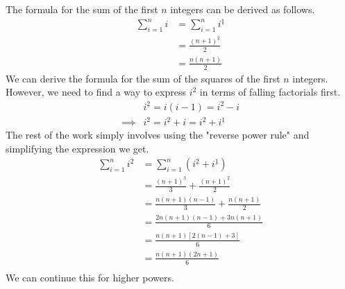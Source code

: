 \documentclass[12pt]{article}
\theoremstyle{definition}
\begin{document}
The formula for the sum of the first $n$ integers can be derived as follows.
\begin{align*}
    \sum_{i=1}^{n} i & = \sum_{i=1}^{n} i^{\underline{1}} \\
                     & = \frac{(n+1)^{\underline{2}}}{2}  \\
                     & = \frac{n(n+1)}{2}
\end{align*}
We can derive the formula for the sum of the squares of the first $n$ integers. However, we need to find a way to express $i^2$ in terms of falling factorials first.
\begin{align*}
             & i^{\underline{2}} = i(i-1) = i^2 - i                                \\
    \implies & i^2 = i^{\underline{2}} + i = i^{\underline{2}} + i^{\underline{1}}
\end{align*}
The rest of the work simply involves using the "reverse power rule" and simplifying the expression we get.
\begin{align*}
    \sum_{i=1}^{n} i^2 & = \sum_{i=1}^{n} \left( i^{\underline{2}} + i^{\underline{1}} \right) \\
                       & = \frac{(n+1)^{\underline{3}}}{3} + \frac{(n+1)^{\underline{2}}}{2}   \\
                       & = \frac{n(n+1)(n-1)}{3} + \frac{n(n+1)}{2}                            \\
                       & = \frac{2n(n+1)(n-1) + 3n(n+1)}{6}                                    \\
                       & = \frac{n(n+1)[2(n-1) + 3]}{6}                                        \\
                       & = \frac{n(n+1)(2n+1)}{6}                                              \\
\end{align*}
We can continue this for higher powers.
\end{document}
